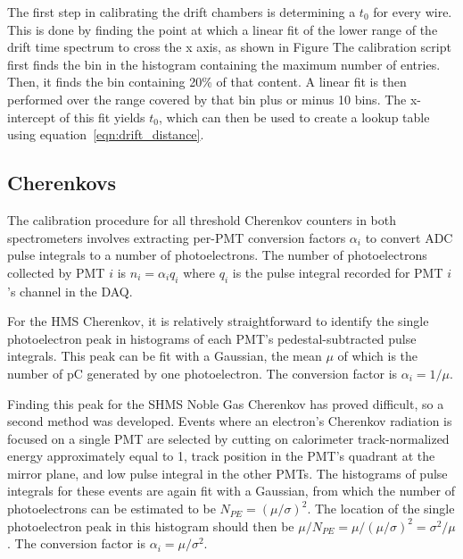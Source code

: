 The first step in calibrating the drift chambers is determining a $t_0$ for
every wire.
This is done by finding the point at which a linear fit of the lower range of
the drift time spectrum to cross the x axis, as shown in Figure %
The calibration script first finds the bin in the histogram
containing the maximum number of entries. 
Then, it finds the bin containing 20\% of that content.
A linear fit is then performed over the range covered by that bin plus or minus
10 bins. %
The x-intercept of this fit yields $t_0$, which can then be used to create a
lookup table using equation~\ref{eqn:drift_distance}.



\subsection{Cherenkovs}

The calibration procedure for all threshold Cherenkov counters in both
spectrometers involves extracting per-PMT conversion factors $\alpha_i$ to
convert ADC pulse integrals to a number of photoelectrons.
The number of photoelectrons collected by PMT $i$ is $n_i=\alpha_iq_i$ where
$q_i$ is the pulse integral recorded for PMT $i$'s channel in the DAQ.


For the HMS Cherenkov, it is relatively straightforward to identify the single
photoelectron peak in histograms of each PMT's pedestal-subtracted pulse
integrals.
This peak can be fit with a Gaussian, the mean $\mu$ of which is the number of
\si{\pico\coulomb} generated by one photoelectron.
The conversion factor is $\alpha_i=1/\mu$.


Finding this peak for the SHMS Noble Gas Cherenkov has proved difficult, so a
second method was developed.
Events where an electron's Cherenkov radiation is focused on a single PMT are
selected by cutting on
calorimeter track-normalized energy approximately equal to 1,
track position in the PMT's quadrant at the mirror plane,
and low pulse integral in the other PMTs.
The histograms of pulse integrals for these events are again fit with a
Gaussian, from which the number of photoelectrons can be estimated to be
$N_{PE}=(\mu/\sigma)^2$.
The location of the single photoelectron peak in this histogram should then
be $\mu/N_{PE}=\mu/(\mu/\sigma)^2=\sigma^2/\mu$.
The conversion factor is $\alpha_i=\mu/\sigma^2$.



